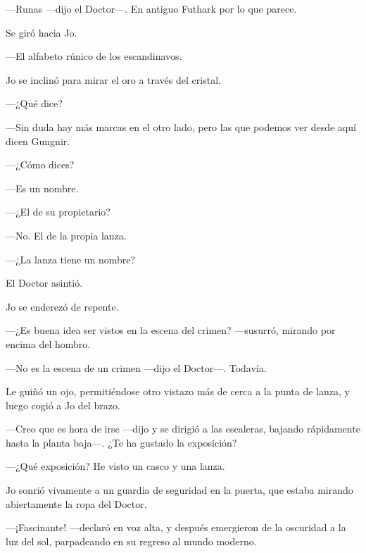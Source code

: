 ---Runas ---dijo el Doctor---. En antiguo Futhark por lo que parece.

Se giró hacia Jo.

---El alfabeto rúnico de los escandinavos.

Jo se inclinó para mirar el oro a través del cristal.

---¿Qué dice?

---Sin duda hay más marcas en el otro lado, pero las que podemos ver
desde aquí dicen Gungnir.

---¿Cómo dices?

---Es un nombre.

---¿El de su propietario?

---No. El de la propia lanza.

---¿La lanza tiene un nombre?

El Doctor asintió.

Jo se enderezó de repente.

---¿Es buena idea ser vistos en la escena del crimen? ---susurró,
mirando por encima del hombro.

---No es la escena de un crimen ---dijo el Doctor---. Todavía.

Le guiñó un ojo, permitiéndose otro vistazo más de cerca a la punta de
lanza, y luego cogió a Jo del brazo.

---Creo que es hora de irse ---dijo y se dirigió a las escaleras,
bajando rápidamente hasta la planta baja---. ¿Te ha gustado la
exposición?

---¿Qué exposición? He visto un casco y una lanza.

Jo sonrió vivamente a un guardia de seguridad en la puerta, que estaba
mirando abiertamente la ropa del Doctor.

---¡Fascinante! ---declaró en voz alta, y después emergieron de la
oscuridad a la luz del sol, parpadeando en su regreso al mundo moderno.